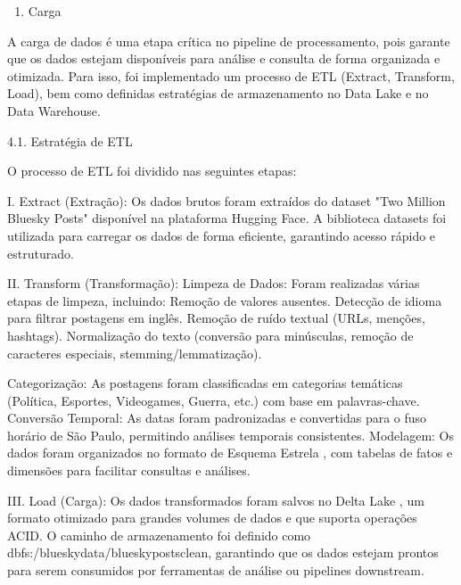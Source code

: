 \documentclass[
  letterpaper,
  DIV=11,
  numbers=noendperiod]{scrartcl}
\providecommand{\tightlist}{%
  \setlength{\itemsep}{0pt}\setlength{\parskip}{0pt}}\usepackage{longtable,booktabs,array}
\begin{document}
\begin{enumerate}
\def\labelenumi{\arabic{enumi}.}
\setcounter{enumi}{3}
\tightlist
\item
  Carga
\end{enumerate}

A carga de dados é uma etapa crítica no pipeline de processamento, pois
garante que os dados estejam disponíveis para análise e consulta de
forma organizada e otimizada. Para isso, foi implementado um processo de
ETL (Extract, Transform, Load), bem como definidas estratégias de
armazenamento no Data Lake e no Data Warehouse.

4.1. Estratégia de ETL

O processo de ETL foi dividido nas seguintes etapas:

\begin{VerbatimWithBreaks}
I. Extract (Extração):  
    Os dados brutos foram extraídos do dataset "Two Million Bluesky Posts" disponível na plataforma Hugging Face.
    A biblioteca datasets foi utilizada para carregar os dados de forma eficiente, garantindo acesso rápido e estruturado.
     

II. Transform (Transformação):  
    Limpeza de Dados:  Foram realizadas várias etapas de limpeza, incluindo:
        Remoção de valores ausentes.
        Detecção de idioma para filtrar postagens em inglês.
        Remoção de ruído textual (URLs, menções, hashtags).
        Normalização do texto (conversão para minúsculas, remoção de caracteres especiais, stemming/lemmatização).
         
    Categorização:  As postagens foram classificadas em categorias temáticas (Política, Esportes, Videogames, Guerra, etc.) com base em palavras-chave.
    Conversão Temporal:  As datas foram padronizadas e convertidas para o fuso horário de São Paulo, permitindo análises temporais consistentes.
    Modelagem:  Os dados foram organizados no formato de Esquema Estrela , com tabelas de fatos e dimensões para facilitar consultas e análises.
     

III. Load (Carga):  
    Os dados transformados foram salvos no Delta Lake , um formato otimizado para grandes volumes de dados e que suporta operações ACID.
    O caminho de armazenamento foi definido como dbfs:/bluesky\textunderscore data/bluesky\textunderscore posts\textunderscore clean, garantindo que os dados estejam prontos para serem consumidos por ferramentas de análise ou pipelines downstream.
     
 
\end{VerbatimWithBreaks}
\end{document}
